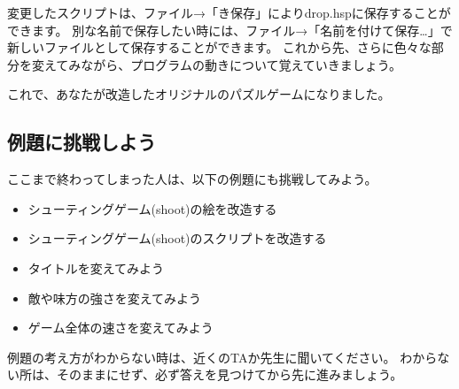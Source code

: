 変更したスクリプトは、ファイル→「き保存」によりdrop.hspに保存することができます。
別な名前で保存したい時には、ファイル→「名前を付けて保存…」で新しいファイルとして保存することができます。
これから先、さらに色々な部分を変えてみながら、プログラムの動きについて覚えていきましょう。

これで、あなたが改造したオリジナルのパズルゲームになりました。

\subsection{例題に挑戦しよう}

ここまで終わってしまった人は、以下の例題にも挑戦してみよう。

\begin{itemize}
    \item シューティングゲーム(shoot)の絵を改造する
    \item シューティングゲーム(shoot)のスクリプトを改造する
    \item タイトルを変えてみよう
    \item 敵や味方の強さを変えてみよう
    \item ゲーム全体の速さを変えてみよう
\end{itemize}

例題の考え方がわからない時は、近くのTAか先生に聞いてください。
わからない所は、そのままにせず、必ず答えを見つけてから先に進みましょう。